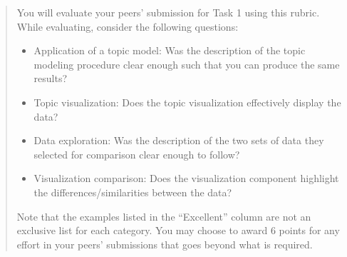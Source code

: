 \documentclass[11pt]{article}
\providecommand{\tightlist}{%
      \setlength{\itemsep}{0pt}\setlength{\parskip}{0pt}}
\begin{document}
\begin{quote}
You will evaluate your peers' submission for Task 1 using this rubric.
While evaluating, consider the following questions:

\begin{itemize}
\tightlist
\item
  Application of a topic model: Was the description of the topic
  modeling procedure clear enough such that you can produce the same
  results?
\item
  Topic visualization: Does the topic visualization effectively display
  the data?
\item
  Data exploration: Was the description of the two sets of data they
  selected for comparison clear enough to follow?
\item
  Visualization comparison: Does the visualization component highlight
  the differences/similarities between the data?
\end{itemize}

Note that the examples listed in the ``Excellent'' column are not an
exclusive list for each category. You may choose to award 6 points for
any effort in your peers' submissions that goes beyond what is required.


\end{quote}
\end{document}
